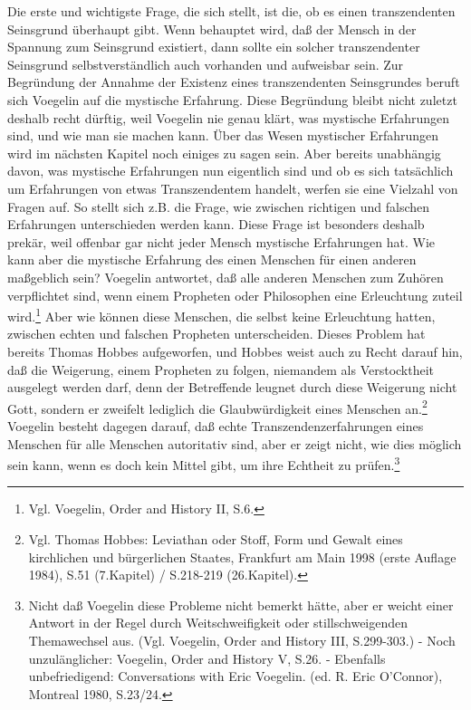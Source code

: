 Die erste und wichtigste Frage, die sich stellt, ist die, ob es einen
transzendenten Seinsgrund überhaupt gibt. Wenn behauptet wird, daß der Mensch
in der Spannung zum Seinsgrund existiert, dann sollte ein solcher
transzendenter Seinsgrund selbstverständlich auch vorhanden und aufweisbar
sein. Zur Begründung der Annahme der Existenz eines transzendenten
Seinsgrundes beruft sich Voegelin auf die mystische Erfahrung. Diese
Begründung bleibt nicht zuletzt deshalb recht dürftig, weil Voegelin nie genau
klärt, was mystische Erfahrungen sind, und wie man sie machen kann. Über das
Wesen mystischer Erfahrungen wird im nächsten Kapitel noch einiges zu sagen
sein. Aber bereits unabhängig davon, was mystische Erfahrungen nun eigentlich
sind und ob es sich tatsächlich um Erfahrungen von etwas Transzendentem
handelt, werfen sie eine Vielzahl von Fragen auf. So stellt sich z.B. die
Frage, wie zwischen richtigen und falschen Erfahrungen unterschieden werden
kann. Diese Frage ist besonders deshalb prekär, weil offenbar gar nicht jeder
Mensch mystische Erfahrungen hat. Wie kann aber die mystische Erfahrung des
einen Menschen für einen anderen maßgeblich sein? Voegelin antwortet, daß alle
anderen Menschen zum Zuhören verpflichtet sind, wenn einem Propheten oder
Philosophen eine Erleuchtung zuteil wird.\footnote{Vgl. Voegelin, Order and
  History II, S.6.} Aber wie können diese Menschen, die selbst keine
Erleuchtung hatten, zwischen echten und falschen Propheten unterscheiden.
Dieses Problem hat bereits Thomas Hobbes aufgeworfen, und Hobbes weist auch zu
Recht darauf hin, daß die Weigerung, einem Propheten zu folgen, niemandem als
Verstocktheit ausgelegt werden darf, denn der Betreffende leugnet durch diese
Weigerung nicht Gott, sondern er zweifelt lediglich die Glaubwürdigkeit eines
Menschen an.\footnote{Vgl. Thomas Hobbes: Leviathan oder Stoff, Form und
  Gewalt eines kirchlichen und bürgerlichen Staates, Frankfurt am Main 1998
  (erste Auflage 1984), S.51 (7.Kapitel) / S.218-219 (26.Kapitel).} Voegelin
besteht dagegen darauf, daß echte Transzendenzerfahrungen eines Menschen für
alle Menschen autoritativ sind, aber er zeigt nicht, wie dies möglich sein
kann, wenn es doch kein Mittel gibt, um ihre Echtheit zu
prüfen.\footnote{Nicht daß Voegelin diese Probleme nicht bemerkt hätte, aber
  er weicht einer Antwort in der Regel durch Weitschweifigkeit oder
  stillschweigenden Themawechsel aus. (Vgl.  Voegelin, Order and History III,
  S.299-303.) - Noch unzulänglicher: Voegelin, Order and History V, S.26. -
  Ebenfalls unbefriedigend: Conversations with Eric Voegelin. (ed. R. Eric
  O'Connor), Montreal 1980, S.23/24.}


